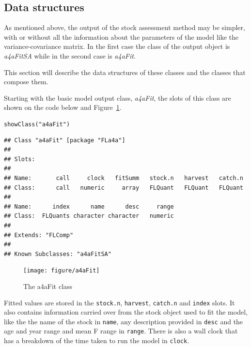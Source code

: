 \documentclass[a4paper,english,10pt]{article}\usepackage[]{graphicx}\usepackage[]{color}
\makeatletter
\newcommand{\hlstr}[1]{\textcolor[rgb]{0.2,0.2,0.2}{#1}}%
\newcommand{\hlstd}[1]{\textcolor[rgb]{0,0,0}{#1}}%
\newcommand{\hlkwd}[1]{\textcolor[rgb]{0.361,0.506,0.596}{#1}}%
\newenvironment{kframe}{%
 \def\at@end@of@kframe{}%
 \ifinner\ifhmode%
  \def\at@end@of@kframe{\end{minipage}}%
  \begin{minipage}{\columnwidth}%
 \fi\fi%
 \def\FrameCommand##1{\hskip\@totalleftmargin \hskip-\fboxsep
 \colorbox{shadecolor}{##1}\hskip-\fboxsep
     \hskip-\linewidth \hskip-\@totalleftmargin \hskip\columnwidth}%
 \MakeFramed {\advance\hsize-\width
   \@totalleftmargin\z@ \linewidth\hsize
   \@setminipage}}%
 {\par\unskip\endMakeFramed%
 \at@end@of@kframe}
\newenvironment{knitrout}{}{} %
\newcommand{\code}[1]{{\texttt{#1}}}
\newcommand{\class}[1]{{\textit{#1}}}
\makeatother
\begin{document}
\subsection{Data structures}

As mentioned above, the output of the stock assessment method may be simpler, with or without all the information about the parameters of the model like the variance-covariance matrix. In the first case the class of the output object is \class{a4aFitSA} while in the second case is \class{a4aFit}.

This section will describe the data structures of these classes and the classes that compose them.

Starting with the basic model output class, \class{a4aFit}, the slots of this class are shown on the code below and Figure~\ref{fig:a4aFit}.

\begin{knitrout}
\color{fgcolor}\begin{kframe}
\begin{alltt}
\hlkwd{showClass}\hlstd{(}\hlstr{"a4aFit"}\hlstd{)}
\end{alltt}
\begin{verbatim}
## Class "a4aFit" [package "FLa4a"]
## 
## Slots:
##                                                                   
## Name:       call     clock   fitSumm   stock.n   harvest   catch.n
## Class:      call   numeric     array   FLQuant   FLQuant   FLQuant
##                                               
## Name:      index      name      desc     range
## Class:  FLQuants character character   numeric
## 
## Extends: "FLComp"
## 
## Known Subclasses: "a4aFitSA"
\end{verbatim}
\end{kframe}
\end{knitrout}

\begin{knitrout}
\color{fgcolor}\begin{figure}[H]


{\centering \texttt{[image: figure/a4aFit]} 

}

\caption[The a4aFit class]{The a4aFit class\label{fig:a4aFit}}
\end{figure}


\end{knitrout}

Fitted values are stored in the \code{stock.n}, \code{harvest}, \code{catch.n} and \code{index} slots. It also contains information carried over from the stock object used to fit the model, like the the name of the stock in \code{name}, any description provided in \code{desc} and the age and year range and mean F range in \code{range}. There is also a wall clock that has a breakdown of the time taken to run the model in \code{clock}.
\end{document}
